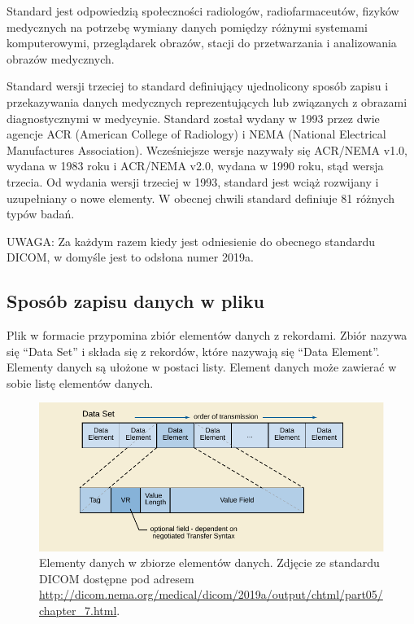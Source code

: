 \label{sec:dicom}

\par
Standard \DICOM jest odpowiedzią społeczności radiologów, radiofarmaceutów, fizyków medycznych na potrzebę wymiany danych pomiędzy różnymi systemami komputerowymi, przeglądarek obrazów, stacji do przetwarzania i analizowania obrazów medycznych.

\par
Standard \DICOM wersji trzeciej to standard definiujący ujednolicony sposób zapisu i przekazywania danych medycznych reprezentujących lub związanych z obrazami diagnostycznymi w medycynie.
Standard został wydany w 1993 przez dwie agencje ACR (American College of Radiology) i NEMA (National Electrical Manufactures Association).
Wcześniejsze wersje nazywały się ACR/NEMA v1.0, wydana w 1983 roku i ACR/NEMA v2.0, wydana w 1990 roku, stąd wersja trzecia.
Od wydania wersji trzeciej w 1993, standard jest wciąż rozwijany i uzupełniany o nowe elementy.
W obecnej chwili standard \DICOM definiuje 81 różnych typów badań.

UWAGA: Za każdym razem kiedy jest odniesienie do obecnego standardu DICOM, w domyśle jest to odsłona numer 2019a.

\subsection{Sposób zapisu danych w pliku \DICOM}

\par
Plik w formacie \DICOM przypomina zbiór elementów danych z rekordami.
Zbiór nazywa się \enquote{Data Set} i składa się z rekordów, które nazywają się \enquote{Data Element}.
Elementy danych są ułożone w postaci listy.
Element danych może zawierać w sobie listę elementów danych.

\begin{figure}[!htbp]
    \centering
    \includegraphics[]{img/dicom-dataelement001.pdf}
    \caption{Elementy danych w zbiorze elementów danych. Zdjęcie ze standardu DICOM dostępne pod adresem \url{http://dicom.nema.org/medical/dicom/2019a/output/chtml/part05/chapter_7.html}.}
    \label{fig:dicom-dataelement}
\end{figure}

